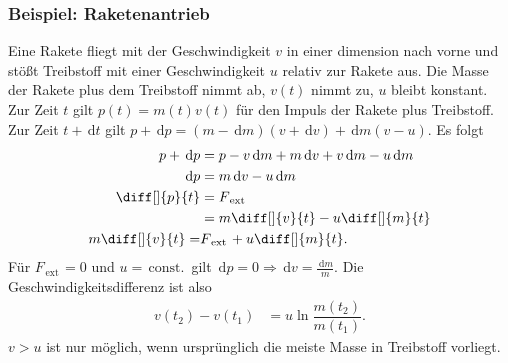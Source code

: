 \documentclass[a4paper,12pt]{article}
\newcommand{\td}{\,\text{d}}
\numberwithin{equation}{section}
\begin{document}
\subsubsection{Beispiel: Raketenantrieb}
Eine Rakete fliegt mit der Geschwindigkeit $v$ in einer dimension nach vorne und stößt Treibstoff mit einer Geschwindigkeit $u$ relativ zur Rakete aus. Die Masse der Rakete plus dem Treibstoff nimmt ab, $v(t)$ nimmt zu, $u$ bleibt konstant. Zur Zeit $t$ gilt $p(t)=m(t)v(t)$ für den Impuls der Rakete plus Treibstoff. Zur Zeit $t+\td t$ gilt $p+\td p=\left(m-\td m\right)\left(v+\td v\right)+\td m\left(v-u\right)$. Es folgt
\begin{align*}
        p+\td p&=p-v\td m+m\td v+v\td m-u\td m\\
        \td p&=m\td v-u\td m\\
        \diff[]{p}{t}&=F_{\,\text{ext}\,}\\
                     &=m\diff[]{v}{t}-u\diff[]{m}{t}\\
        m\diff[]{v}{t}=&F_{\,\text{ext}\,}+u\diff[]{m}{t}
.\end{align*}
Für $F_{\,\text{ext}\,}=0$ und $u=\,\text{const.}\,$ gilt $\td p=0\Rightarrow \td v=\tfrac{\td m}{m}$. Die Geschwindigkeitsdifferenz ist also
\begin{align*}
        v(t_2)-v(t_1)&=u\ln \dfrac{m(t_2)}{m(t_1)}
.\end{align*}
$v>u$ ist nur möglich, wenn ursprünglich die meiste Masse in Treibstoff vorliegt.
\end{document}
